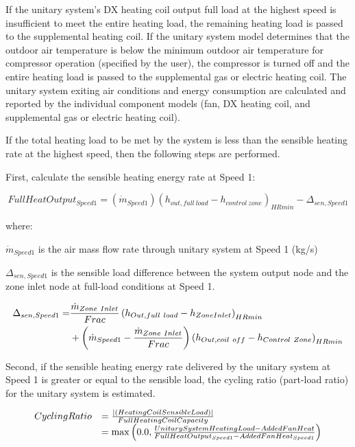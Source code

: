 If the unitary system's DX heating coil output full load at the highest speed is insufficient to meet the entire heating load, the remaining heating load is passed to the supplemental heating coil. If the unitary system model determines that the outdoor air temperature is below the minimum outdoor air temperature for compressor operation (specified by the user), the compressor is turned off and the entire heating load is passed to the supplemental gas or electric heating coil. The unitary system exiting air conditions and energy consumption are calculated and reported by the individual component models (fan, DX heating coil, and supplemental gas or electric heating coil).

If the total heating load to be met by the system is less than the sensible heating rate at the highest speed, then the following steps are performed.

First, calculate the sensible heating energy rate at Speed 1:

\begin{equation}
FullHeatOutpu{t_{Speed1}} = ({\dot m_{Speed1}}){({h_{out,full~load}} - {h_{control~zone}})_{HRmin}} - {\Delta_{sen,Speed1}}
\end{equation}

where:

\({\dot m_{Speed1}}\) is the air mass flow rate through unitary system at Speed 1 (kg/s)

\(\Delta_{sen,Speed1}\) is the sensible load difference between the system output node and the zone inlet node at full-load conditions at Speed 1.

\begin{equation}
  \begin{split}
    \Delta_{sen,Speed1} =& \frac{\dot{m}_{Zone~Inlet}}{Frac} \left(h_{Out,full~load} - h_{ZoneInlet}\right)_{HRmin} \\
                              &+ \left(\dot{m}_{Speed1} - \frac{\dot{m}_{Zone~Inlet}}{Frac}\right) \left(h_{Out,coil~off} - h_{Control~Zone}\right)_{HRmin}
  \end{split}
\end{equation}

Second, if the sensible heating energy rate delivered by the unitary system at Speed 1 is greater or equal to the sensible load, the cycling ratio (part-load ratio) for the unitary system is estimated.

\begin{equation}
  \begin{array}{rl}
    CyclingRatio &= \frac{\left|\left(HeatingCoilSensibleLoad\right)\right|}{FullHeatingCoilCapacity} \\
                 &= \max \left(0.0,\frac{UnitarySystemHeatingLoad - AddedFanHeat}{FullHeatOutput_{Speed1} - AddedFanHeat_{Speed1}}\right)
  \end{array}
\end{equation}

